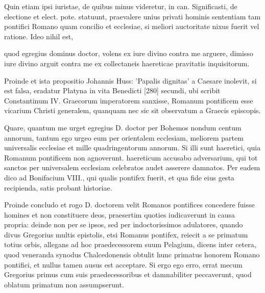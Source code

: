 Quin etiam ipsi iuristae, de quibus minus videretur, in can. Significasti, de electione et elect. pote. statuunt, praevalere unius privati hominis sententiam tam pontifici Romano quam concilio et ecclesiae, si meliori auctoritate nixus fuerit vel ratione. Ideo nihil est,

quod egregius dominus doctor, volens ex iure divino contra me arguere, dimisso iure divino arguit contra me ex collectaneis haereticae pravitatis inquisitorum.

Proinde et ista propositio Johannis Huss: 'Papalis dignitas' a Caesare inolevit, si est falsa, eradatur Platyna in vita Benedicti [280] secundi, ubi scribit Constantinum IV. Graecorum imperatorem sanxisse, Romanum pontificem esse vicarium Christi generalem, quanquam nec sic sit observatum a Graecis episcopis.

Quare, quantum me urget egregius D. doctor per Bohemos nondum centum annorum, tantum ego urgeo eum per orientalem ecclesiam, meliorem partem universalis ecclesiae et mille quadringentorum annorum. Si illi sunt haeretici, quia Romanum pontificem non agnoverunt. haereticum accusabo adversarium, qui tot sanctos per universalem ecclesiam celebratos audet asserere damnatos. Per eadem dico ad Bonifacium VIII., qui qualis pontifex fuerit, et qua fide eius gesta recipienda, satis probant historiae.

Proinde concludo et rogo D. doctorem velit Romanos pontifices concedere fuisse homines et non constituere deos, praesertim quoties iudicaverunt in causa propria: deinde non per se ipsos, sed per indoctorissimos adulatores, quando divus Gregorius multis epistolis, etsi Romanus pontifex, reiecit a se primatum totius orbis, allegans ad hoc praedecessorem suum Pelagium, dicens inter cetera, quod veneranda synodus Chalcedonensis obtulit hunc primatus honorem Romano pontifici, et nullus tamen ausus est acceptare. Si ergo ego erro, errat mecum Gregorius primus cum suis praedecessoribus et damnabiliter peccaverunt, quod oblatum primatum non assumpserunt.

